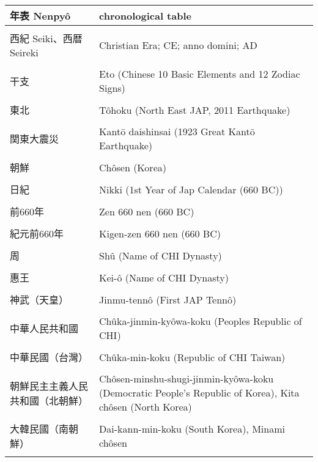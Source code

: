 \documentclass{article}
\begin{document}
\begin{tabular}{ l | p{10.5cm} }
年表 Nenpyô		&chronological table \\ \hline \\[-1em]
西紀 Seiki、西暦 Seireki		&Christian Era; CE; anno domini; AD \\ \hline \\[-1em] %
干支 						&Eto (Chinese 10 Basic Elements and 12 Zodiac Signs)\\ \hline \\[-1em]
東北 						&Tôhoku (North East JAP, 2011 Earthquake)\\ \hline \\[-1em]
関東大震災  &Kantō daishinsai (1923 Great Kantō Earthquake) \\ \hline \\[-1em]
朝鮮 						&Chôsen	 (Korea)\\ \hline \\[-1em]
日紀 						&Nikki (1st Year of Jap Calendar (660 BC))\\ \hline \\[-1em]
前660年 						&Zen 660 nen (660 BC)\\ \hline \\[-1em]
紀元前660年 					&Kigen-zen 660 nen (660 BC)\\ \hline \\[-1em]
周  							&Shû (Name of CHI Dynasty)\\ \hline \\[-1em]            %
惠王 						&Kei-ô (Name of CHI Dynasty)\\ \hline \\[-1em]          %
神武（天皇）					&Jinmu-tennô  (First JAP Tennô)\\ \hline \\[-1em]
中華人民共和國 				&Chûka-jinmin-kyôwa-koku	(Peoples Republic of CHI) \\ \hline \\[-1em]
中華民國（台灣）					&Chûka-min-koku (Republic of CHI {Taiwan})\\ \hline \\[-1em]
朝鮮民主主義人民共和國（北朝鮮） 	&Chôsen-minshu-shugi-jinmin-kyôwa-koku (Democratic People's Republic of Korea), Kita chôsen (North Korea)\\ \hline \\[-1em]
大韓民國（南朝鮮） 				& Dai-kann-min-koku (South Korea), Minami chôsen	\\ \hline \\[-1em]

\end{tabular}
\end{document}
